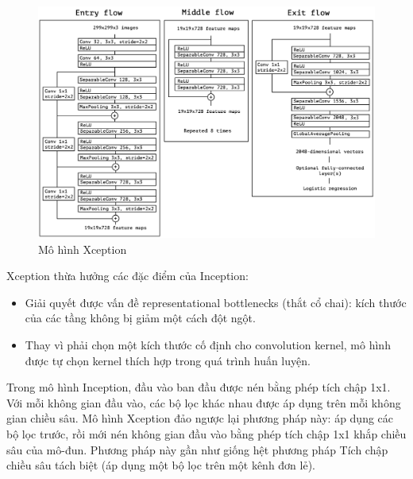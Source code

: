 \documentclass[a4paper,14pt]{extarticle}
\begin{document}
	\begin{figure}[H]
		\centering
		\includegraphics[scale=1]{images/xception_model_doc.png}
		\caption{Mô hình Xception}
	\end{figure}

	\pagebreak

	Xception thừa hưởng các đặc điểm của Inception: 
	
	\begin{itemize}
		\item  Giải quyết được vấn đề representational bottlenecks (thắt cổ chai): kích thước của các tầng không bị giảm một cách đột ngột.
		\item  Thay vì phải chọn một kích thước cố định cho convolution kernel, mô hình được tự chọn kernel thích hợp trong quá trình huấn luyện.
	\end{itemize}

	\null

	Trong mô hình Inception, đầu vào ban đầu được nén bằng phép tích chập 1x1. Với mỗi không gian đầu vào, các bộ lọc khác nhau được áp dụng trên mỗi không gian chiều sâu. Mô hình Xception đảo ngược lại phương pháp này: áp dụng các bộ lọc trước, rồi mới nén không gian đầu vào bằng phép tích chập 1x1 khắp chiều sâu của mô-đun. Phương pháp này gần như giống hệt phương pháp Tích chập chiều sâu tách biệt (áp dụng một bộ lọc trên một kênh đơn lẻ).
\end{document}
